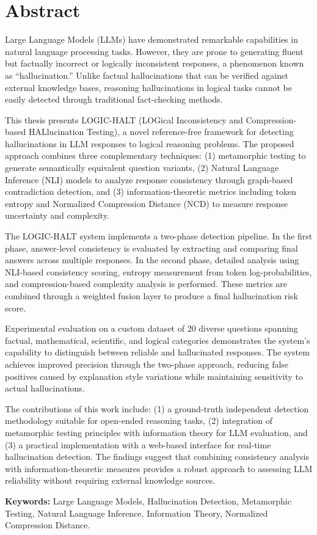 \chapter*{Abstract}

Large Language Models (LLMs) have demonstrated remarkable capabilities in natural language processing tasks. However, they are prone to generating fluent but factually incorrect or logically inconsistent responses, a phenomenon known as ``hallucination.'' Unlike factual hallucinations that can be verified against external knowledge bases, reasoning hallucinations in logical tasks cannot be easily detected through traditional fact-checking methods.

This thesis presents LOGIC-HALT (LOGical Inconsistency and Compression-based HALlucination Testing), a novel reference-free framework for detecting hallucinations in LLM responses to logical reasoning problems. The proposed approach combines three complementary techniques: (1) metamorphic testing to generate semantically equivalent question variants, (2) Natural Language Inference (NLI) models to analyze response consistency through graph-based contradiction detection, and (3) information-theoretic metrics including token entropy and Normalized Compression Distance (NCD) to measure response uncertainty and complexity.

The LOGIC-HALT system implements a two-phase detection pipeline. In the first phase, answer-level consistency is evaluated by extracting and comparing final answers across multiple responses. In the second phase, detailed analysis using NLI-based consistency scoring, entropy measurement from token log-probabilities, and compression-based complexity analysis is performed. These metrics are combined through a weighted fusion layer to produce a final hallucination risk score.

Experimental evaluation on a custom dataset of 20 diverse questions spanning factual, mathematical, scientific, and logical categories demonstrates the system's capability to distinguish between reliable and hallucinated responses. The system achieves improved precision through the two-phase approach, reducing false positives caused by explanation style variations while maintaining sensitivity to actual hallucinations.

The contributions of this work include: (1) a ground-truth independent detection methodology suitable for open-ended reasoning tasks, (2) integration of metamorphic testing principles with information theory for LLM evaluation, and (3) a practical implementation with a web-based interface for real-time hallucination detection. The findings suggest that combining consistency analysis with information-theoretic measures provides a robust approach to assessing LLM reliability without requiring external knowledge sources.

\vfill
\textbf{Keywords:} Large Language Models, Hallucination Detection, Metamorphic Testing, Natural Language Inference, Information Theory, Normalized Compression Distance.
\clearpage
